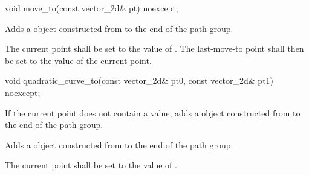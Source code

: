 \begin{itemdecl}
    void move_to(const vector_2d& pt) noexcept;
\end{itemdecl}
\begin{itemdescr}
	\pnum
	\effects
	Adds a  object constructed from  to the end of the path group.
	
	\pnum
	The current point shall be set to the value of . The last-move-to point shall then be set to the value of the current point.
\end{itemdescr}

\begin{itemdecl}
	void quadratic_curve_to(const vector_2d& pt0, const vector_2d& pt1)
	  noexcept;
\end{itemdecl}
\begin{itemdescr}
	\pnum
	\effects
	If the current point does not contain a value, adds a  object constructed from  to the end of the path group.
	
	\pnum
	Adds a  object constructed from  to the end of the path group.
	
	\pnum
	The current point shall be set to the value of .
\end{itemdescr}

